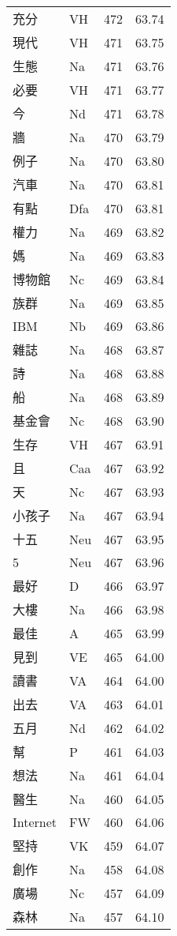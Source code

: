 \documentclass[twocolumn]{book}
\begin{document}
\begin{supertabular}{llrr}
充分 & VH & 472 &  63.74\\
現代 & VH & 471 &  63.75\\
生態 & Na & 471 &  63.76\\
必要 & VH & 471 &  63.77\\
今 & Nd & 471 &  63.78\\
牆 & Na & 470 &  63.79\\
例子 & Na & 470 &  63.80\\
汽車 & Na & 470 &  63.81\\
有點 & Dfa & 470 &  63.81\\
權力 & Na & 469 &  63.82\\
媽 & Na & 469 &  63.83\\
博物館 & Nc & 469 &  63.84\\
族群 & Na & 469 &  63.85\\
IBM & Nb & 469 &  63.86\\
雜誌 & Na & 468 &  63.87\\
詩 & Na & 468 &  63.88\\
船 & Na & 468 &  63.89\\
基金會 & Nc & 468 &  63.90\\
生存 & VH & 467 &  63.91\\
且 & Caa & 467 &  63.92\\
天 & Nc & 467 &  63.93\\
小孩子 & Na & 467 &  63.94\\
十五 & Neu & 467 &  63.95\\
5 & Neu & 467 &  63.96\\
最好 & D & 466 &  63.97\\
大樓 & Na & 466 &  63.98\\
最佳 & A & 465 &  63.99\\
見到 & VE & 465 &  64.00\\
讀書 & VA & 464 &  64.00\\
出去 & VA & 463 &  64.01\\
五月 & Nd & 462 &  64.02\\
幫 & P & 461 &  64.03\\
想法 & Na & 461 &  64.04\\
醫生 & Na & 460 &  64.05\\
Internet & FW & 460 &  64.06\\
堅持 & VK & 459 &  64.07\\
創作 & Na & 458 &  64.08\\
廣場 & Nc & 457 &  64.09\\
森林 & Na & 457 &  64.10\\

\end{supertabular}
\end{document}
